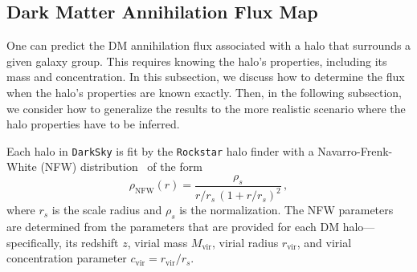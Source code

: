 \subsection{Dark Matter Annihilation Flux Map}
\label{sec:dmflux}

One can predict the DM annihilation flux associated with a halo that surrounds a given galaxy group.  This requires knowing the halo's properties, including its mass and concentration.  In this subsection, we discuss how to determine the flux when the halo's properties are known exactly.  Then, in the following subsection, we consider how to generalize the results to the more realistic scenario where the halo properties have to be inferred.

Each halo in \texttt{DarkSky} is fit by the \texttt{Rockstar} halo finder with 
a Navarro-Frenk-White (NFW) distribution~\cite{Navarro:1995iw} of the form
\begin{equation}
\rho_\text{NFW}(r)=\frac{\rho_{s}}{r/r_{s}\,(1+r/r_{s})^{2}}\, ,
\label{eq:NFW}
\end{equation}
where $r_s$ is the scale radius and $\rho_s$ is the normalization.  The NFW parameters are determined from the parameters that are provided for each DM halo---specifically, its redshift $z$, virial mass $M_\text{vir}$, virial radius $r_\text{vir}$, and virial concentration parameter $c_{\text{vir}}=r_\text{vir}/r_{s}$.

